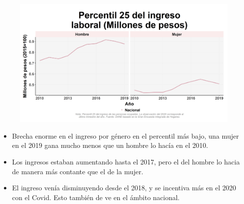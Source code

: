     \begin{figure}[H]
        \caption[Percentil 25 del ingreso laboral por género]{ \label{ingreso_laboral_25_genero} }
        \begin{center}
        \includegraphics[width=\textwidth,keepaspectratio]{img/var_4_trend.png}
        \end{center}
    \end{figure}
            \begin{itemize}
                    \item Brecha enorme en el ingreso por género en el percentil más bajo, una mujer en el 2019 gana mucho menos que un hombre lo hacía en el 2010.
                    \item Los ingresos estaban aumentando hasta el 2017, pero el del hombre lo hacia de manera más contante que el de la mujer.
                    \item El ingreso venía disminuyendo desde el 2018, y se incentiva más en el 2020 con el Covid. Esto también de ve en el ámbito nacional.
                \end{itemize}

